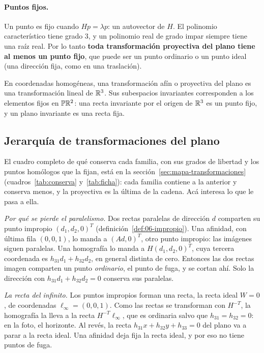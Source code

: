 \paragraph{Puntos fijos.}
Un punto es fijo cuando \(Hp=\lambda p\): un autovector de \(H\). El polinomio característico
tiene grado \(3\), y un polinomio real de grado impar siempre tiene una raíz real. Por lo tanto
\textbf{toda transformación proyectiva del plano tiene al menos un punto fijo}, que puede ser
un punto ordinario o un punto ideal (una dirección fija, como en una traslación).

\begin{idea}[Puntos fijos del plano = subespacios invariantes de \(\R^3\)]
En coordenadas homogéneas, una transformación afín o proyectiva del plano es una
transformación lineal de \(\R^3\). Sus subespacios invariantes corresponden a los elementos
fijos en \(\mathbb{P}\mathbb{R}^2\): una recta invariante por el origen de \(\R^3\) es un punto fijo,
y un plano invariante es una recta fija.
\end{idea}

\subsection{Jerarquía de transformaciones del plano}\label{sec:jerarquia}

El cuadro completo de qué conserva cada familia, con sus grados de libertad y los puntos
homólogos que la fijan, está en la sección~\ref{sec:mapa-transformaciones}
(cuadros~\ref{tab:conserva} y~\ref{tab:ficha}): cada familia contiene a la anterior y conserva
menos, y la proyectiva es la última de la cadena. Acá interesa lo que le pasa a ella.

\emph{Por qué se pierde el paralelismo.} Dos rectas paralelas de dirección \(d\) comparten su
punto impropio \((d_1,d_2,0)^T\) (definición~\ref{def:06-impropio}). Una afinidad, con última
fila \((0,0,1)\), lo manda a \((Ad,0)^T\), otro punto impropio: las imágenes siguen paralelas.
Una homografía lo manda a \(H(d_1,d_2,0)^T\), cuya tercera coordenada es
\(h_{31}d_1+h_{32}d_2\), en general distinta de cero. Entonces las dos rectas imagen comparten
un punto \emph{ordinario}, el punto de fuga, y se cortan ahí. Solo la dirección con
\(h_{31}d_1+h_{32}d_2=0\) conserva sus paralelas.

\emph{La recta del infinito.} Los puntos impropios forman una recta, la recta ideal
\(W=0\), de coordenadas \(\ell_\infty=(0,0,1)\). Como las rectas se transforman con
\(H^{-T}\), la homografía la lleva a la recta \(H^{-T}\ell_\infty\), que es ordinaria salvo que
\(h_{31}=h_{32}=0\): en la foto, el horizonte. Al revés, la recta
\(h_{31}x+h_{32}y+h_{33}=0\) del plano va a parar a la recta ideal. Una afinidad deja fija la
recta ideal, y por eso no tiene puntos de fuga.

